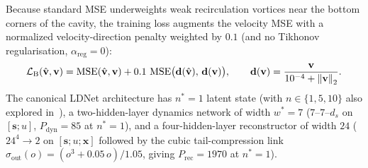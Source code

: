Because standard MSE underweights weak recirculation vortices near the bottom corners of the cavity, the training loss augments the velocity MSE with a normalized velocity-direction penalty weighted by $0.1$ (and no Tikhonov regularisation, $\alpha_{\mathrm{reg}} = 0$):
\begin{equation}
  \mathcal{L}_{\mathrm{B}}(\hat{\mathbf{v}}, \mathbf{v}) = \operatorname{MSE}(\hat{\mathbf{v}}, \mathbf{v}) + 0.1\,\operatorname{MSE}\!\big(\mathbf{d}(\hat{\mathbf{v}}),\, \mathbf{d}(\mathbf{v})\big), \qquad
  \mathbf{d}(\mathbf{v}) = \frac{\mathbf{v}}{10^{-4} + \left\lVert \mathbf{v} \right\rVert_2}.
  \label{eq:caseB_loss}
\end{equation}
The canonical LDNet architecture has $n^* = 1$ latent state (with $n \in \{1,5,10\}$ also explored in~\cite{regazzoni2024learning}), a two-hidden-layer dynamics network of width $w^* = 7$ ($7\text{--}7\text{--}d_s$ on $[\mathbf{s}; u]$, $P_{\mathrm{dyn}} = 85$ at $n^*=1$), and a four-hidden-layer reconstructor of width $24$ ($24^4 \to 2$ on $[\mathbf{s}; u; \mathbf{x}]$ followed by the cubic tail-compression link $\sigma_{\mathrm{out}}(o) = (o^3 + 0.05\,o)/1.05$, giving $P_{\mathrm{rec}} = 1970$ at $n^*=1$).

